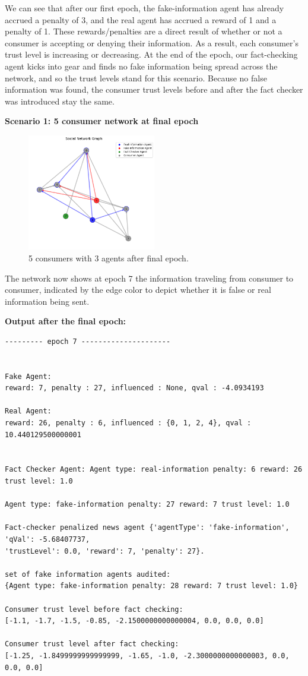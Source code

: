 \documentclass[twoside]{article}
\begin{document}
We can see that after our first epoch, the fake-information agent has already accrued a penalty of 3, and the real agent has accrued a reward of 1 and a penalty of 1. These rewards/penalties are a direct result of whether or not a consumer is accepting or denying their information. As a result, each consumer's trust level is increasing or decreasing. At the end of the epoch, our fact-checking agent kicks into gear and finds no fake information being spread across the network, and so the trust levels stand for this scenario. Because no false information was found, the consumer trust levels before and after the fact checker was introduced stay the same.

\textbf{Scenario 1: 5 consumer network at final epoch}

\begin{figure}[htbp]
     \centering
     \includegraphics[width=0.5\textwidth]{../results/images/output1.png}
     \caption{5 consumers with 3 agents after final epoch.}
     \label{fig: 5 consumer, 3 agents}
 \end{figure}
 
The network now shows at epoch 7 the information traveling from consumer to consumer, indicated by the edge color to depict whether it is false or real information being sent.

\textbf{Output after the final epoch:}
\begin{verbatim}
--------- epoch 7 ---------------------


Fake Agent: 
reward: 7, penalty : 27, influenced : None, qval : -4.0934193

Real Agent: 
reward: 26, penalty : 6, influenced : {0, 1, 2, 4}, qval : 10.440129500000001


Fact Checker Agent: Agent type: real-information penalty: 6 reward: 26 trust level: 1.0

Agent type: fake-information penalty: 27 reward: 7 trust level: 1.0

Fact-checker penalized news agent {'agentType': 'fake-information', 'qVal': -5.68407737, 
'trustLevel': 0.0, 'reward': 7, 'penalty': 27}.

set of fake information agents audited:  
{Agent type: fake-information penalty: 28 reward: 7 trust level: 1.0}

Consumer trust level before fact checking:  
[-1.1, -1.7, -1.5, -0.85, -2.1500000000000004, 0.0, 0.0, 0.0]

Consumer trust level after fact checking: 
[-1.25, -1.8499999999999999, -1.65, -1.0, -2.3000000000000003, 0.0, 0.0, 0.0]
\end{verbatim}
\end{document}

